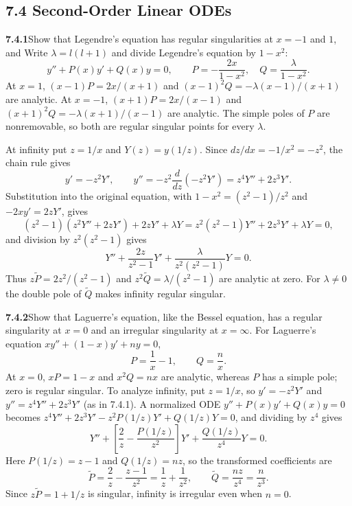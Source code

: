 \subsection*{7.4 Second-Order Linear ODEs}

\par\bigskip
\noindent\textbf{7.4.1}\quad Show that Legendre's equation has regular
singularities at $x=-1$ and $1$, and 
\solution
Write $\lambda=l(l+1)$ and divide Legendre's equation by $1-x^2$:
\[
y''+P(x)y'+Q(x)y=0,\qquad
P=-\frac{2x}{1-x^2},\quad Q=\frac\lambda{1-x^2}.
\]
At $x=1$, $(x-1)P=2x/(x+1)$ and
$(x-1)^2Q=-\lambda(x-1)/(x+1)$ are analytic. At $x=-1$,
$(x+1)P=2x/(x-1)$ and
$(x+1)^2Q=-\lambda(x+1)/(x-1)$ are analytic.
The simple poles of $P$ are nonremovable, so both are regular singular
points for every $\lambda$.

At infinity put $z=1/x$ and $Y(z)=y(1/z)$. Since $dz/dx=-1/x^2=-z^2$,
the chain rule gives
\[
y'=-z^2Y',\qquad y''=-z^2\frac d{dz}(-z^2Y')=z^4Y''+2z^3Y'.
\]
Substitution into the original equation, with $1-x^2=(z^2-1)/z^2$ and
$-2xy'=2zY'$, gives
\[
(z^2-1)(z^2Y''+2zY')+2zY'+\lambda Y
=z^2(z^2-1)Y''+2z^3Y'+\lambda Y=0,
\]
and division by $z^2(z^2-1)$ gives
\[
Y''+\frac{2z}{z^2-1}Y'+\frac\lambda{z^2(z^2-1)}Y=0.
\]
Thus $z\widetilde P=2z^2/(z^2-1)$ and
$z^2\widetilde Q=\lambda/(z^2-1)$ are analytic at zero. For
$\lambda\ne0$ the double pole of $\widetilde Q$ makes infinity regular
singular.

\par\bigskip
\noindent\textbf{7.4.2}\quad Show that Laguerre's equation, like the Bessel
equation, has a regular singularity at $x=0$ and an irregular singularity at
$x=\infty$.
\solution
For Laguerre's equation $xy''+(1-x)y'+ny=0$,
\[
P=\frac1x-1,\qquad Q=\frac nx.
\]
At $x=0$, $xP=1-x$ and $x^2Q=nx$ are analytic, whereas $P$ has a
simple pole; zero is regular singular.
To analyze infinity, put $z=1/x$, so $y'=-z^2Y'$ and
$y''=z^4Y''+2z^3Y'$ (as in 7.4.1). A normalized ODE
$y''+P(x)y'+Q(x)y=0$ becomes
$z^4Y''+2z^3Y'-z^2P(1/z)Y'+Q(1/z)Y=0$, and dividing by $z^4$ gives
\[
Y''+\left[\frac2z-\frac{P(1/z)}{z^2}\right]Y'
       +\frac{Q(1/z)}{z^4}Y=0.
\]
Here $P(1/z)=z-1$ and $Q(1/z)=nz$, so the transformed coefficients are
\[
\widetilde P=\frac2z-\frac{z-1}{z^2}=\frac1z+\frac1{z^2},\qquad
\widetilde Q=\frac{nz}{z^4}=\frac n{z^3}.
\]
Since $z\widetilde P=1+1/z$ is singular, infinity is irregular even
when $n=0$.

